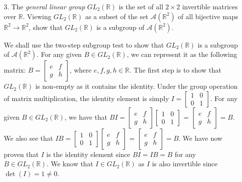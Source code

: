\documentclass[12pt,letterpaper,reqno]{amsart}
\newcommand{\R}{\mathbb R}
\begin{document}
\begin{enumerate}
\item[3.] The \textit{general linear group} $GL_2 (\R)$ is the set of all $2 \times 2$ invertible matrices over $\R$. Viewing $GL_2 (\R)$ as a subset of the set $\mathcal{A}(\R^2)$ of all bijective maps $\R^2 \rightarrow \R^2$, show that $GL_2(\R)$ is a subgroup of $\mathcal{A}(\R^2)$.
\newline

\begin{flushleft}
We shall use the two-step subgroup test to show that $GL_2(\R)$ is a subgroup of $\mathcal{A}(\R^2)$. For any given $B \in GL_2(\R)$, we can represent it as the following matrix: $B = \begin{bmatrix} e & f \\g & h \end{bmatrix}$, where $e, f, g, h \in \R$. The first step is to show that $GL_2(\R)$ is non-empty as it contains the identity. Under the group operation of matrix multiplication, the identity element is simply $I = \begin{bmatrix} 1 & 0 \\0 & 1 \end{bmatrix}$. For any given $B \in GL_2(\R)$, we have that $BI = \begin{bmatrix} e & f \\g & h \end{bmatrix}\begin{bmatrix} 1 & 0 \\0 & 1 \end{bmatrix}$ = $\begin{bmatrix} e & f \\g & h \end{bmatrix} = B$. We also see that $IB = \begin{bmatrix} 1 & 0 \\0 & 1 \end{bmatrix}\begin{bmatrix} e & f \\g & h \end{bmatrix}$ = $\begin{bmatrix} e & f \\g & h \end{bmatrix} = B$. We have now proven that $I$ is the identity element since $BI = IB = B$ for any $B \in GL_2(\R)$. We know that $I \in GL_2(\R)$ as $I$ is also invertible since $\det(I) = 1 \not= 0$.
\newline


\end{flushleft}
\end{enumerate}
\end{document}
